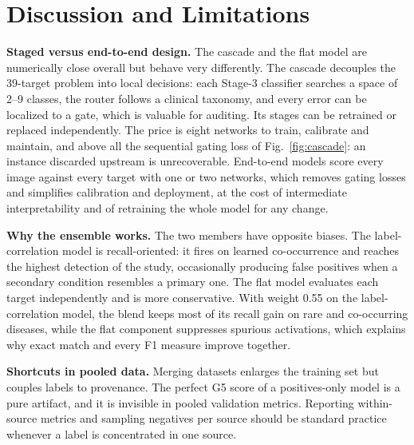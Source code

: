 \documentclass[conference]{IEEEtran}
\begin{document}
\section{Discussion and Limitations}
\textbf{Staged versus end-to-end design.} The cascade and the flat model are
numerically close overall but behave very differently. The cascade decouples the
39-target problem into local decisions: each Stage-3 classifier searches a space of
2--9 classes, the router follows a clinical taxonomy, and every error can be
localized to a gate, which is valuable for auditing. Its stages can be retrained or
replaced independently. The price is eight networks to train, calibrate and
maintain, and above all the sequential gating loss of Fig.~\ref{fig:cascade}: an
instance discarded upstream is unrecoverable. End-to-end models score every image
against every target with one or two networks, which removes gating losses and
simplifies calibration and deployment, at the cost of intermediate interpretability
and of retraining the whole model for any change.

\textbf{Why the ensemble works.} The two members have opposite biases. The
label-correlation model is recall-oriented: it fires on learned co-occurrence and
reaches the highest detection of the study, occasionally producing false positives
when a secondary condition resembles a primary one. The flat model evaluates each
target independently and is more conservative. With weight 0.55 on the
label-correlation model, the blend keeps most of its recall gain on rare and
co-occurring diseases, while the flat component suppresses spurious activations,
which explains why exact match and every F1 measure improve together.

\textbf{Shortcuts in pooled data.} Merging datasets enlarges the training set but
couples labels to provenance. The perfect G5 score of a positives-only model is a
pure artifact, and it is invisible in pooled validation metrics. Reporting
within-source metrics and sampling negatives per source should be standard practice
whenever a label is concentrated in one source.
\end{document}
